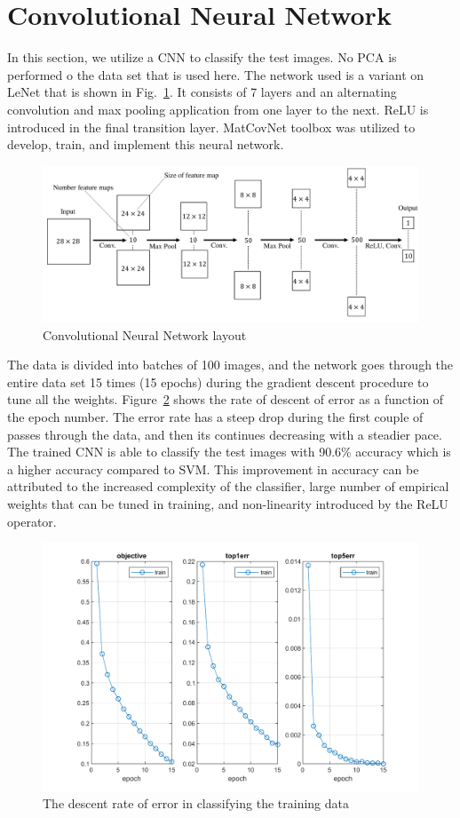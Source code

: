 \documentclass[12pt]{article}
\begin{document}
\section{Convolutional Neural Network}
In this section, we utilize a CNN to classify the test images. No PCA is performed o the data set that is used here. The network used is a variant on LeNet that is shown in Fig.~\ref{fig:NN}. It consists of 7 layers and an alternating convolution and max pooling application from one layer to the next. ReLU is introduced in the final transition layer. MatCovNet toolbox was utilized to develop, train, and implement this neural network.  
\begin{figure}[H]
 \centering
  \includegraphics[width=\linewidth]{NN.pdf}
  \caption{Convolutional Neural Network layout}
  \label{fig:NN}
\end{figure}
The data is divided into batches of 100 images, and the network goes through the entire data set 15 times (15 epochs) during the gradient descent procedure to tune all the weights. Figure~\ref{fig:Error} shows the rate of descent of error as a function of the epoch number. The error rate has a steep drop during the first couple of passes through the data, and then its continues decreasing with a steadier pace. The trained CNN is able to classify the test images with 90.6\% accuracy which is a higher accuracy compared to SVM. This improvement in accuracy can be attributed to the increased complexity of the classifier, large number of empirical weights that can be tuned in training, and non-linearity introduced by the ReLU operator. 
\begin{figure}[H]
 \centering
  \includegraphics[width=\linewidth]{Error.pdf}
  \caption{The descent rate of error in classifying the training data}
  \label{fig:Error}
\end{figure}
\end{document}
